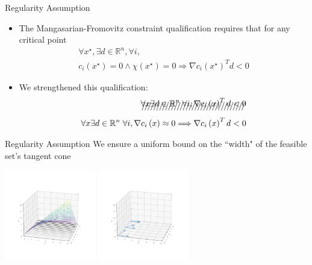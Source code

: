 \documentclass{beamer}
\newcommand{\Rn}{\mathbb R ^ {n}}
\begin{document}
\begin{frame}{Regularity Assumption}
\begin{itemize}
\item The Mangasarian-Fromovitz constraint qualification requires that for any critical point 
\begin{align*}
\forall x^{\star}, \exists d \in \Rn, \forall i, \\
c_i\left(x^{\star}\right)=0 \wedge \chi\left(x^{\star}\right) = 0 \Longrightarrow \nabla c_i\left(x^{\star}\right)^T d < 0 
\end{align*}
\item We strengthened this qualification:
\begin{align*}
\xout{\forall x \exists d \in \Rn\; \forall i, \nabla c_i\left(x\right)^T d < 0} \\
\forall x \exists d \in \Rn\; \forall i, \nabla c_i\left(x\right) \approx 0 \Longrightarrow \nabla c_i\left(x\right)^T d < 0 \\
\end{align*}
\end{itemize}
\end{frame}

\begin{frame}{Regularity Assumption}
	We ensure a uniform bound on the ``width" of the feasible set's tangent cone
	\begin{center}
		\includegraphics[width=150px]{images/decreasing_regularity.png}
		\includegraphics[width=150px]{images/decreasing_regularity_2.png}
	\end{center}
\end{frame}
\end{document}
